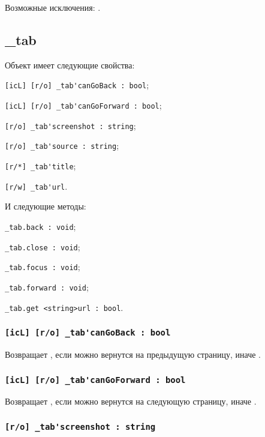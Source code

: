 Возможные исключения: .

\subsection{{\color{orange} \_tab}}

Объект \tab{} имеет следующие свойства:
\begin{icItems}
	\item \lstinline|[icL] [r/o] _tab'canGoBack : bool|;
	\item \lstinline|[icL] [r/o] _tab'canGoForward : bool|;
	\item \lstinline|[r/o] _tab'screenshot : string|;
	\item \lstinline|[r/o] _tab'source : string|;
	\item \lstinline|[r/*] _tab'title|;
	\item \lstinline|[r/w] _tab'url|.
\end{icItems}

И следующие методы:
\begin{icItems}
	\item \lstinline|_tab.back : void|;
	\item \lstinline|_tab.close : void|;
	\item \lstinline|_tab.focus : void|;
	\item \lstinline|_tab.forward : void|;
	\item \lstinline|_tab.get <string>url : bool|.
\end{icItems}

\subsubsection{\lstinline|[icL] [r/o] _tab'canGoBack : bool|}

Возвращает \true, если можно вернутся на предыдущую страницу, иначе \false.

\subsubsection{\lstinline|[icL] [r/o] _tab'canGoForward : bool|}

Возвращает \true, если можно вернутся на следующую страницу, иначе \false.

\subsubsection{\lstinline|[r/o] _tab'screenshot : string|}

